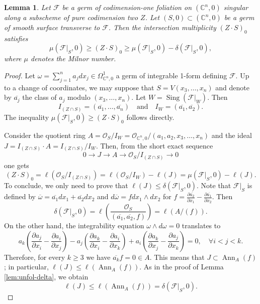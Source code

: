 \documentclass[a4paper, 11pt]{amsart}
\newcommand{\CC}{\mathbb{C}}
\theoremstyle{plain}
\numberwithin{theorem}{section}
\newtheorem{lemma}[theorem]{Lemma}
\theoremstyle{definition}
\DeclareMathOperator{\Hom}{Hom}
\DeclareMathOperator{\sing}{Sing}
\DeclareMathOperator{\ann}{Ann}
\newcommand{\OO}{\mathcal{O}}
\newcommand{\lra}{\longrightarrow}
\newcommand{\sF}{\mathscr{F}}
\begin{document}
\begin{lemma}\label{lem:key-lemma}
Let $\sF$ be a germ of codimension-one foliation on $(\CC^n,0)$ singular along a subscheme of pure codimension two $Z$. Let $(S, 0) \subset (\CC^n,0)$ be a germ of smooth surface transverse to $\sF$. Then the intersection multiplicity $(Z\cdot S)_0$ satisfies
\[
\mu(\sF|_S,0)  \geq (Z\cdot S)_0 \geq \mu(\sF|_S,0) - \delta(\sF|_S,0),
\]
where $\mu$ denotes the Milnor number.
\end{lemma}

\begin{proof}
    Let $\omega = \sum_{j=1}^n a_j dx_j \in \Omega_{\CC^n,0}^1$ a germ of integrable 1-form defining $\sF$. Up to a change of coordinates, we may suppose that $S = V(x_3, \dots, x_n)$ and denote by $\overline{a_j}$ the class of $a_j$ modulo $(x_3, \dots,x_n)$. Let $W = \sing(\sF|_W)$. Then 
    \[
    I_{(Z\cap S)} = (\overline{a_1}, \dots, \overline{a_n}) \quad \text{and} \quad  I_W = (\overline{a_1},\overline{a_2}). 
    \]
    The inequality $\mu(\sF|_S,0)  \geq (Z\cdot S)_0$ follows directly. 
    
    Consider the quotient ring $A = \OO_S/I_W  = \OO_{\CC^n,0}/(a_1,a_2,x_3, \dots, x_n)$ and the ideal $J = I_{(Z\cap S)}\cdot A = I_{(Z\cap S)}/I_W$. Then, from the short exact sequence
    \[
    0 \lra J \lra A \lra \OO_S/I_{(Z\cap S)} \lra 0
    \]
    one gets
    \[
    (Z\cdot S)_0 = \ell(\OO_S/I_{(Z\cap S)}) = \ell(\OO_S/I_W) -\ell(J) = \mu(\sF|_S,0) - \ell(J).
    \]
    To conclude, we only need to prove that $\ell(J) \leq \delta(\sF|_S,0)$. Note that $\sF|_S$ is defined by $\overline{\omega} = \overline{a_1} dx_1 + \overline{a_2}dx_2$ and $d\overline{\omega} = fdx_1\wedge dx_2$ for $f = \frac{\partial \overline{a_2} }{\partial x_1} - \frac{\partial \overline{a_1} }{\partial x_2}$. Then 
    \[
    \delta(\sF|_S,0) =  \ell \left(\frac{\OO_S}{\left(\overline{a_1},\overline{a_2}, f \right)}\right) = \ell \left(A/(f)\right).
    \]
    On the other hand, the integrability equation $\omega \wedge d\omega = 0$ translates to 
    \[
    a_k \left( \frac{\partial a_j }{\partial x_i} - \frac{\partial  a_i }{\partial x_j} \right) - 
    a_j \left( \frac{\partial a_k }{\partial x_i} - \frac{\partial  a_i }{\partial x_k} \right) + 
    a_i \left( \frac{\partial a_k }{\partial x_j} - \frac{\partial  a_j }{\partial x_k} \right) = 0, \quad \forall i<j<k.
    \]
   Therefore, for every $k\geq 3$ we have $\overline{a_k}f  = 0 \in A$. This means that $J \subset \ann_A(f)$; in particular, $\ell(J) \leq \ell(\ann_A(f))$. As in the proof of Lemma \ref{lem:unfol-delta}, we obtain 
   \[
   \ell(J) \leq \ell(\ann_A(f)) = \delta(\sF|_S,0).
   \]
\end{proof}
\end{document}
